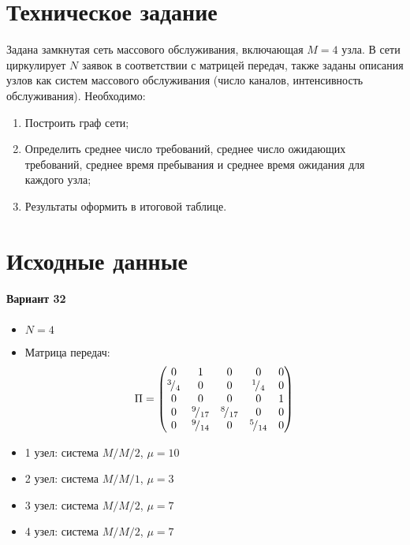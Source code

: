 





\tableofcontents
\listoftables
\listoffigures
\newpage

\section{Техническое задание}

Задана замкнутая сеть массового обслуживания, включающая $M = 4$ узла. В сети циркулирует $N$ заявок в соответствии с матрицей передач, также заданы описания узлов как систем массового обслуживания (число каналов, интенсивность обслуживания). Необходимо:
\begin{enumerate}
	\item Построить граф сети;
	\item Определить среднее число требований, среднее число ожидающих требований, среднее время пребывания и среднее время ожидания для каждого узла;
	\item Результаты оформить в итоговой таблице.
\end{enumerate}

\section{Исходные данные}

\paragraph{Вариант 32}

\begin{itemize}
	\item $N = 4$
	\item Матрица передач:
	\begin{displaymath}
		\Pi = \begin{pmatrix}
			0 & 1 & 0 & 0 & 0 \\
			{}^{3}\!/_{4} & 0 & 0 & {}^{1}\!/_{4} & 0 \\
			0 & 0 & 0 & 0 & 1 \\
			0 & {}^{9}\!/_{17} & {}^{8}\!/_{17} & 0 & 0 \\
			0 & {}^{9}\!/_{14} & 0 & {}^{5}\!/_{14} & 0
		\end{pmatrix}
	\end{displaymath}
	\item 1 узел: система $M/M/2$, $\mu = 10$
	\item 2 узел: система $M/M/1$, $\mu = 3$
	\item 3 узел: система $M/M/2$, $\mu = 7$
	\item 4 узел: система $M/M/2$, $\mu = 7$
\end{itemize}

